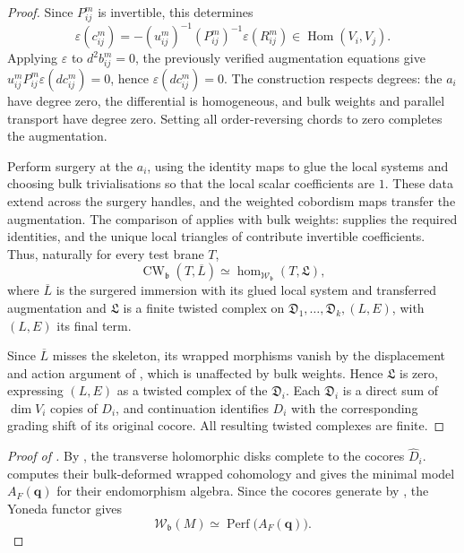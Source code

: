 \documentclass[a4paper]{amsart}
\DeclareMathOperator{\CW}{CW}
\DeclareMathOperator{\Perf}{Perf}
\numberwithin{equation}{section}
\begin{document}
\begin{proof}
Since $P_{ij}^m$ is invertible, this determines
\[
 \varepsilon(c_{ij}^m)=-(u_{ij}^m)^{-1}(P_{ij}^m)^{-1}
 \varepsilon(R_{ij}^m)\in\operatorname{Hom}(V_i,V_j).
\]
Applying $\varepsilon$ to $d^2b_{ij}^m=0$, the previously verified
augmentation equations give $u_{ij}^m P_{ij}^m\varepsilon(dc_{ij}^m)=0$,
hence $\varepsilon(dc_{ij}^m)=0$. The construction respects degrees:
the $a_i$ have degree zero, the differential is homogeneous, and bulk
weights and parallel transport have degree zero. Setting all order-reversing
chords to zero completes the augmentation.

Perform surgery at the $a_i$, using the identity maps to glue the
local systems and choosing bulk trivialisations so that the local
scalar coefficients are $1$. These data extend across the surgery
handles, and the weighted cobordism maps transfer the
augmentation. The comparison of \cite[Proposition~8.16]{CDRGG}
applies with bulk weights:  supplies
the required identities, and the unique local triangles of
\cite[Lemma~4.14 and Corollary~4.18]{CDRGG} contribute invertible
coefficients. Thus, naturally for every test brane $T$,
\[
 \CW_{\mathfrak{b}}(T,\overline L)
 \simeq\operatorname{hom}_{\mathcal W_{\mathfrak{b}}}(T,\mathfrak L),
\]
where $\overline L$ is the surgered immersion with its glued local system and transferred
augmentation and $\mathfrak L$ is a finite twisted complex on
$\mathfrak D_1,\ldots,\mathfrak D_k,(L,E)$, with $(L,E)$ its final term.

Since $\overline L$ misses the skeleton, its wrapped morphisms vanish
by the displacement and action argument of
\cite[Proposition~7.6]{CDRGG}, which is unaffected by bulk weights.
Hence $\mathfrak L$ is zero, expressing $(L,E)$ as a twisted complex of
the $\mathfrak D_i$. Each $\mathfrak D_i$ is a direct sum of
$\dim V_i$ copies of $D_i$, and continuation identifies $D_i$ with
the corresponding grading shift of its original cocore. All resulting
twisted complexes are finite.
\end{proof}

\begin{proof}[Proof of ]
By , the transverse holomorphic disks
complete to the cocores $\widehat D_i$.
 computes their bulk-deformed wrapped cohomology
and gives the minimal model $A_F(\boldsymbol q)$ for their endomorphism
algebra. Since the cocores generate by , the
Yoneda functor gives
\[
 \mathcal W_{\mathfrak b}(M)\simeq\Perf\bigl(A_F(\boldsymbol q)\bigr).
\]
\end{proof}
\end{document}
